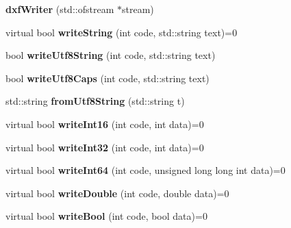 \begin{DoxyCompactItemize}
\item 
\hypertarget{classdxfWriter_a6144e17b1eb593cf9eeef5276e8312bc}{{\bfseries dxf\-Writer} (std\-::ofstream $\ast$stream)}\label{classdxfWriter_a6144e17b1eb593cf9eeef5276e8312bc}

\item 
\hypertarget{classdxfWriter_a63b9ff453f41759914c73c108450e6ec}{virtual bool {\bfseries write\-String} (int code, std\-::string text)=0}\label{classdxfWriter_a63b9ff453f41759914c73c108450e6ec}

\item 
\hypertarget{classdxfWriter_a2519b606405ddd8b14d88fff3bb31c9b}{bool {\bfseries write\-Utf8\-String} (int code, std\-::string text)}\label{classdxfWriter_a2519b606405ddd8b14d88fff3bb31c9b}

\item 
\hypertarget{classdxfWriter_aa03b5b6b366b5551cce5584701ac2a40}{bool {\bfseries write\-Utf8\-Caps} (int code, std\-::string text)}\label{classdxfWriter_aa03b5b6b366b5551cce5584701ac2a40}

\item 
\hypertarget{classdxfWriter_aca2bac33f26041d820dff3cd4e24e9e7}{std\-::string {\bfseries from\-Utf8\-String} (std\-::string t)}\label{classdxfWriter_aca2bac33f26041d820dff3cd4e24e9e7}

\item 
\hypertarget{classdxfWriter_a9c5f609840aeb2a1c3218fff84c1693a}{virtual bool {\bfseries write\-Int16} (int code, int data)=0}\label{classdxfWriter_a9c5f609840aeb2a1c3218fff84c1693a}

\item 
\hypertarget{classdxfWriter_adce2dc57c74bf3ddb03c9769563450f1}{virtual bool {\bfseries write\-Int32} (int code, int data)=0}\label{classdxfWriter_adce2dc57c74bf3ddb03c9769563450f1}

\item 
\hypertarget{classdxfWriter_a454f17fb9213a1dcde6c073e614a9f5a}{virtual bool {\bfseries write\-Int64} (int code, unsigned long long int data)=0}\label{classdxfWriter_a454f17fb9213a1dcde6c073e614a9f5a}

\item 
\hypertarget{classdxfWriter_a2adba3b09587e382ce886ac1a0ef14e7}{virtual bool {\bfseries write\-Double} (int code, double data)=0}\label{classdxfWriter_a2adba3b09587e382ce886ac1a0ef14e7}

\item 
\hypertarget{classdxfWriter_abea6468805103d768fa89ff3d0598334}{virtual bool {\bfseries write\-Bool} (int code, bool data)=0}\label{classdxfWriter_abea6468805103d768fa89ff3d0598334}


\end{DoxyCompactItemize}

